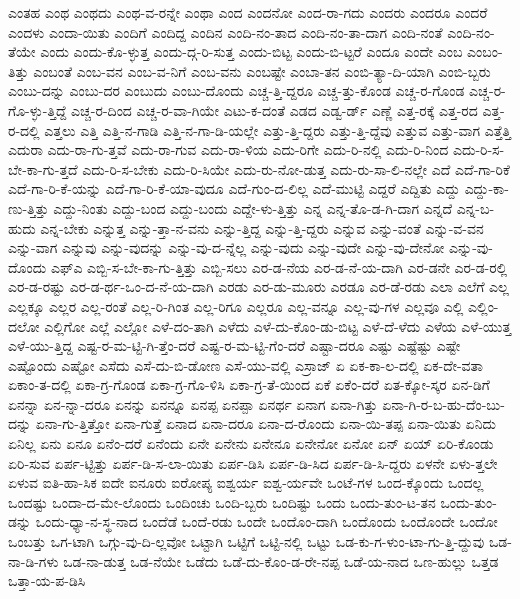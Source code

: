 {ಎಂತಹ
ಎಂಥ
ಎಂಥದು
ಎಂಥ-ವ-ರನ್ನೇ
ಎಂಥಾ
ಎಂದ
ಎಂದನೋ
ಎಂದ-ರಾ-ಗದು
ಎಂದರು
ಎಂದರೂ
ಎಂದರೆ
ಎಂದಳು
ಎಂದಾ-ಯಿತು
ಎಂದಿಗೆ
ಎಂದಿದ್ದ
ಎಂದಿನ
ಎಂದಿ-ನಂ-ತಾದ
ಎಂದಿ-ನಂ-ತಾ-ದಾಗ
ಎಂದಿ-ನಂತೆ
ಎಂದಿ-ನಂ-ತೆಯೇ
ಎಂದು
ಎಂದು-ಕೊ-ಳ್ಳುತ್ತ
ಎಂದು-ದ್ಗ-ರಿ-ಸುತ್ತ
ಎಂದು-ಬಿಟ್ಟ
ಎಂದು-ಬಿ-ಟ್ಟರೆ
ಎಂದೂ
ಎಂದೇ
ಎಂಬ
ಎಂಬಂ-ತಿತ್ತು
ಎಂಬಂತೆ
ಎಂಬ-ವನ
ಎಂಬ-ವ-ನಿಗೆ
ಎಂಬ-ವನು
ಎಂಬಷ್ಟೇ
ಎಂಬಾ-ತನ
ಎಂಬಿ-ತ್ಯಾ-ದಿ-ಯಾಗಿ
ಎಂಬಿ-ಬ್ಬರು
ಎಂಬು-ದನ್ನು
ಎಂಬು-ದರ
ಎಂಬುದು
ಎಂಬು-ದೊಂದು
ಎಚ್ಚ-ತ್ತಿ-ದ್ದರೂ
ಎಚ್ಚ-ತ್ತು-ಕೊಂಡ
ಎಚ್ಚ-ರ-ಗೊಂಡ
ಎಚ್ಚ-ರ-ಗೊ-ಳ್ಳು-ತ್ತಿದ್ದೆ
ಎಚ್ಚ-ರ-ದಿಂದ
ಎಚ್ಚ-ರ-ವಾ-ಗಿಯೇ
ಎಟು-ಕ-ದಂತೆ
ಎಡದ
ಎಡ್ವ-ರ್ಡ್
ಎಣ್ಣೆ
ಎತ್ತ-ರಕ್ಕೆ
ಎತ್ತ-ರದ
ಎತ್ತ-ರ-ದಲ್ಲಿ
ಎತ್ತಲು
ಎತ್ತಿ
ಎತ್ತಿ-ನ-ಗಾಡಿ
ಎತ್ತಿ-ನ-ಗಾ-ಡಿ-ಯಲ್ಲೇ
ಎತ್ತು-ತ್ತಿ-ದ್ದರು
ಎತ್ತು-ತ್ತಿ-ದ್ದೆವು
ಎತ್ತುವ
ಎತ್ತು-ವಾಗ
ಎತ್ತೆತ್ತಿ
ಎದುರಾ
ಎದು-ರಾ-ಗು-ತ್ತವೆ
ಎದು-ರಾ-ಗುವ
ಎದು-ರಾ-ಳಿಯ
ಎದು-ರಿಗೇ
ಎದು-ರಿ-ನಲ್ಲಿ
ಎದು-ರಿ-ನಿಂದ
ಎದು-ರಿ-ಸ-ಬೇ-ಕಾ-ಗು-ತ್ತದೆ
ಎದು-ರಿ-ಸ-ಬೇಕು
ಎದು-ರಿ-ಸಿಯೇ
ಎದು-ರು-ನೋ-ಡುತ್ತ
ಎದು-ರು-ಸಾ-ಲಿ-ನಲ್ಲೇ
ಎದೆ
ಎದೆ-ಗಾ-ರಿಕೆ
ಎದೆ-ಗಾ-ರಿ-ಕೆ-ಯನ್ನು
ಎದೆ-ಗಾ-ರಿ-ಕೆ-ಯಾ-ವುದೂ
ಎದೆ-ಗುಂ-ದ-ಲಿಲ್ಲ
ಎದೆ-ಮುಟ್ಟಿ
ಎದ್ದರೆ
ಎದ್ದಿತು
ಎದ್ದು
ಎದ್ದು-ಕಾ-ಣು-ತ್ತಿತ್ತು
ಎದ್ದು-ನಿಂತು
ಎದ್ದು-ಬಂದ
ಎದ್ದು-ಬಂದು
ಎದ್ದೇ-ಳು-ತ್ತಿತ್ತು
ಎನ್ನ
ಎನ್ನ-ತೊ-ಡ-ಗಿ-ದಾಗ
ಎನ್ನದೆ
ಎನ್ನ-ಬ-ಹುದು
ಎನ್ನ-ಬೇಕು
ಎನ್ನುತ್ತ
ಎನ್ನು-ತ್ತಾ-ನ-ವನು
ಎನ್ನು-ತ್ತಿದ್ದ
ಎನ್ನು-ತ್ತಿ-ದ್ದರು
ಎನ್ನುವ
ಎನ್ನು-ವಂತೆ
ಎನ್ನು-ವ-ವನ
ಎನ್ನು-ವಾಗ
ಎನ್ನುವು
ಎನ್ನು-ವುದನ್ನು
ಎನ್ನು-ವು-ದ-ನ್ನೆಲ್ಲ
ಎನ್ನು-ವುದು
ಎನ್ನು-ವುದೇ
ಎನ್ನು-ವು-ದೇನೋ
ಎನ್ನು-ವು-ದೊಂದು
ಎಫ್ಎ
ಎಬ್ಬಿ-ಸ-ಬೇ-ಕಾ-ಗು-ತ್ತಿತ್ತು
ಎಬ್ಬಿ-ಸಲು
ಎರ-ಡ-ನೆಯ
ಎರ-ಡ-ನೆ-ಯ-ದಾಗಿ
ಎರ-ಡನೇ
ಎರ-ಡ-ರಲ್ಲಿ
ಎರ-ಡ-ರಷ್ಟು
ಎರ-ಡ-ರ್ಥ-ಒಂ-ದ-ನೆ-ಯ-ದಾಗಿ
ಎರಡು
ಎರ-ಡು-ಮೂರು
ಎರಡೂ
ಎರ-ಡೆ-ರಡು
ಎಲಾ
ಎಲೆಗೆ
ಎಲ್ಲ
ಎಲ್ಲಕ್ಕೂ
ಎಲ್ಲರ
ಎಲ್ಲ-ರಂತೆ
ಎಲ್ಲ-ರಿ-ಗಿಂತ
ಎಲ್ಲ-ರಿಗೂ
ಎಲ್ಲರೂ
ಎಲ್ಲ-ವನ್ನೂ
ಎಲ್ಲ-ವು-ಗಳ
ಎಲ್ಲವೂ
ಎಲ್ಲಿ
ಎಲ್ಲಿಂ-ದಲೋ
ಎಲ್ಲಿಗೋ
ಎಲ್ಲೆ
ಎಲ್ಲೋ
ಎಳೆ-ದಂ-ತಾಗಿ
ಎಳೆದು
ಎಳೆ-ದು-ಕೊಂ-ಡು-ಬಿಟ್ಟ
ಎಳೆ-ದೆ-ಳೆದು
ಎಳೆಯ
ಎಳೆ-ಯುತ್ತ
ಎಳೆ-ಯು-ತ್ತಿದ್ದ
ಎಷ್ಟ-ರ-ಮ-ಟ್ಟಿ-ಗಿ-ತ್ತೆಂ-ದರೆ
ಎಷ್ಟ-ರ-ಮ-ಟ್ಟಿ-ಗೆಂ-ದರೆ
ಎಷ್ಟಾ-ದರೂ
ಎಷ್ಟು
ಎಷ್ಟೆಷ್ಟು
ಎಷ್ಟೇ
ಎಷ್ಟೊಂದು
ಎಷ್ಟೋ
ಎಸೆದು
ಎಸೆ-ದು-ಬಿ-ಡೋಣ
ಎಸೆ-ಯು-ವಲ್ಲಿ
ಎಸ್ರಾಜ್
ಏ
ಏಕ-ಕಾ-ಲ-ದಲ್ಲಿ
ಏಕ-ದೇ-ವತಾ
ಏಕಾಂ-ತ-ದಲ್ಲಿ
ಏಕಾ-ಗ್ರ-ಗೊಂಡ
ಏಕಾ-ಗ್ರ-ಗೊ-ಳಿಸಿ
ಏಕಾ-ಗ್ರ-ತೆ-ಯಿಂದ
ಏಕೆ
ಏಕೆಂ-ದರೆ
ಏತ-ಕ್ಕೋ-ಸ್ಕರ
ಏನ-ಡಿಗೆ
ಏನನ್ನಾ
ಏನ-ನ್ನಾ-ದರೂ
ಏನನ್ನು
ಏನನ್ನೂ
ಏನಪ್ಪ
ಏನಪ್ಪಾ
ಏನರ್ಥ
ಏನಾಗ
ಏನಾ-ಗಿತ್ತು
ಏನಾ-ಗಿ-ರ-ಬ-ಹು-ದೆಂ-ಬು-ದನ್ನು
ಏನಾ-ಗು-ತ್ತಿತ್ತೋ
ಏನಾ-ಗುತ್ತೆ
ಏನಾದ
ಏನಾ-ದರೂ
ಏನಾ-ದ-ರೊಂದು
ಏನಾ-ಯಿ-ತಪ್ಪ
ಏನಾ-ಯಿತು
ಏನಿದು
ಏನಿಲ್ಲ
ಏನು
ಏನೂ
ಏನೆಂ-ದರೆ
ಏನೆಂದು
ಏನೇ
ಏನೇನು
ಏನೇನೂ
ಏನೇನೋ
ಏನೋ
ಏನ್
ಏಯ್
ಏರಿ-ಕೊಂಡು
ಏರಿ-ಸುವ
ಏರ್ಪ-ಟ್ಟಿತ್ತು
ಏರ್ಪ-ಡಿ-ಸ-ಲಾ-ಯಿತು
ಏರ್ಪ-ಡಿಸಿ
ಏರ್ಪ-ಡಿ-ಸಿದ
ಏರ್ಪ-ಡಿ-ಸಿ-ದ್ದರು
ಏಳನೇ
ಏಳು-ತ್ತಲೇ
ಏಳುವ
ಐತಿ-ಹಾ-ಸಿಕ
ಐದೇ
ಐನೂರು
ಐರೋಪ್ಯ
ಐಶ್ವರ್ಯ
ಐಶ್ವ-ರ್ಯವೇ
ಒಂಟೆ-ಗಳ
ಒಂದ-ಕ್ಕೊಂದು
ಒಂದಲ್ಲ
ಒಂದಷ್ಟು
ಒಂದಾ-ದ-ಮೇ-ಲೊಂದು
ಒಂದಿಂಚು
ಒಂದಿ-ಬ್ಬರು
ಒಂದಿಷ್ಟು
ಒಂದು
ಒಂದು-ತುಂ-ಟ-ತನ
ಒಂದು-ತುಂ-ಡನ್ನು
ಒಂದು-ಧ್ಯಾ-ನ-ಸ್ಥ-ನಾದ
ಒಂದೆಡೆ
ಒಂದೆ-ರಡು
ಒಂದೇ
ಒಂದೊಂ-ದಾಗಿ
ಒಂದೊಂದು
ಒಂದೊಂದೇ
ಒಂದೋ
ಒಂಬತ್ತು
ಒಗ-ಟಾಗಿ
ಒಗ್ಗು-ವು-ದಿ-ಲ್ಲವೋ
ಒಟ್ಟಾಗಿ
ಒಟ್ಟಿಗೆ
ಒಟ್ಟಿ-ನಲ್ಲಿ
ಒಟ್ಟು
ಒಡ-ಕು-ಗ-ಳುಂ-ಟಾ-ಗು-ತ್ತಿ-ದ್ದುವು
ಒಡ-ನಾ-ಡಿ-ಗಳು
ಒಡ-ನಾ-ಡುತ್ತ
ಒಡ-ನೆಯೇ
ಒಡೆದು
ಒಡೆ-ದು-ಕೊಂ-ಡ-ರೇ-ನಪ್ಪ
ಒಡೆ-ಯ-ನಾದ
ಒಣ-ಹುಲ್ಲು
ಒತ್ತಡ
ಒತ್ತಾ-ಯ-ಪ-ಡಿಸಿ
}
